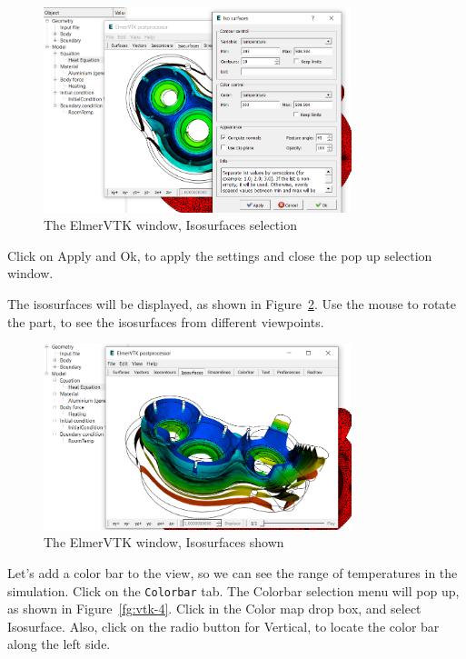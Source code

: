 \begin{figure}[H]
\begin{center}
\includegraphics[width=0.8\textwidth]{vtk-2}
\caption{The ElmerVTK window, Isosurfaces selection}\label{fg:vtk-2}
\end{center}
\end{figure}

Click on Apply and Ok, to apply the settings and close the pop up selection window.

\newpage

The isosurfaces will be displayed, as shown in Figure~\ref{fg:vtk-3}.  Use the mouse to rotate the part, to see the isosurfaces from different viewpoints.

\begin{figure}[H]
\begin{center}
\includegraphics[width=0.8\textwidth]{vtk-3}
\caption{The ElmerVTK window, Isosurfaces shown}\label{fg:vtk-3}
\end{center}
\end{figure}

Let's add a color bar to the view, so we can see the range of temperatures in the simulation.  Click on the \texttt{Colorbar} tab.  The Colorbar selection menu will pop up, as shown in Figure~\ref{fg:vtk-4}.  Click in the Color map drop box, and select Isosurface.  Also, click on the radio button for Vertical, to locate the color bar along the left side.

